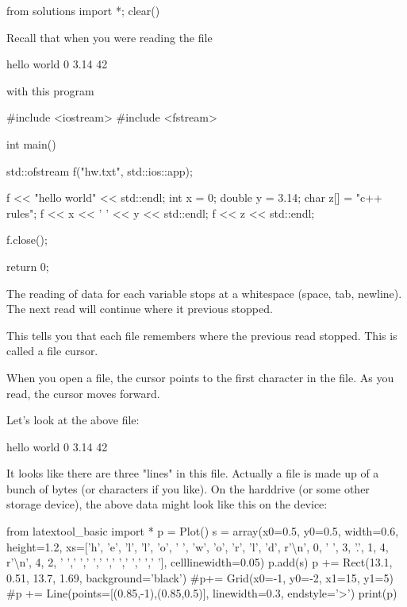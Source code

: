 \begin{python0}
from solutions import *; clear()
\end{python0}

Recall that when you were reading the file

\begin{console}
hello world
0 3.14
42
\end{console}

with this program

\begin{console}
#include <iostream>
#include <fstream>

int main()
{   
    std::ofstream f("hw.txt", std::ios::app);

    f << "hello world" << std::endl;
    int x = 0;
    double y = 3.14;
    char z[] = "c++ rules";
    f << x << ' ' << y << std::endl;
    f << z << std::endl;

    f.close();

    return 0;
}
\end{console}

The reading of data for each variable stops at a whitespace (space, tab, newline). The next read will continue where it previous stopped.

This tells you that each file remembers where the previous read stopped. This is called a file cursor.

When you open a file, the cursor points to the first character in the file. As you read, the cursor moves forward.

Let's look at the above file:

\begin{console}
hello world
0 3.14
42 
\end{console}

It looks like there are three "lines" in this file. Actually a file is made up of a bunch of bytes (or characters if you like). On the harddrive (or some other storage device), the above data might look like this on the device:
\begin{python}
from latextool_basic import *
p = Plot()
s = array(x0=0.5, y0=0.5, width=0.6, height=1.2, xs=['h', 'e', 'l', 'l', 'o', ' ', 'w', 'o', 'r', 'l', 'd', r'\textbackslash n', 0, ' ', 3, '.', 1, 4, r'\textbackslash  n', 4, 2, ' ',' ',' ',' ',' ',' ',' ',' '], celllinewidth=0.05)
p.add(s)
p += Rect(13.1, 0.51, 13.7, 1.69, background='black')
#p+= Grid(x0=-1, y0=-2, x1=15, y1=5)
#p += Line(points=[(0.85,-1),(0.85,0.5)], linewidth=0.3, endstyle='>')
print(p)
\end{python}

